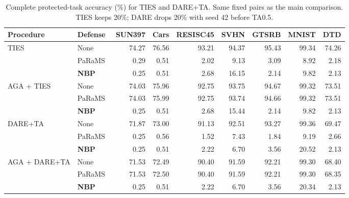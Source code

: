\begin{table}[!t]
\centering
\small
\setlength{\tabcolsep}{4pt}
\caption{Complete protected-task accuracy (\%) for TIES and DARE+TA. Same fixed pairs as the main comparison. TIES keeps 20\%; DARE drops 20\% with seed 42 before TA0.5.}
\label{tab:fusion-tasks}
\begin{tabular}{llrrrrrrr}
\toprule
Procedure & Defense & SUN397 & Cars & RESISC45 & SVHN & GTSRB & MNIST & DTD \\
\midrule
\multirow{3}{*}{TIES} & None & 74.27 & 76.56 & 93.21 & 94.37 & 95.43 & 99.34 & 74.26 \\
 & PaRaMS~\cite{wei2025params} & 0.29 & 0.51 & 2.02 & 9.13 & 3.09 & 8.92 & 2.18 \\
 & \textbf{NBP} & 0.25 & 0.51 & 2.68 & 16.15 & 2.14 & 9.82 & 2.13 \\
\midrule
\multirow{3}{*}{AGA + TIES} & None & 74.03 & 75.96 & 92.75 & 93.75 & 94.67 & 99.32 & 73.51 \\
 & PaRaMS~\cite{wei2025params} & 74.03 & 75.99 & 92.75 & 93.74 & 94.66 & 99.32 & 73.51 \\
 & \textbf{NBP} & 0.25 & 0.51 & 2.68 & 15.44 & 2.14 & 9.82 & 2.13 \\
\midrule
\multirow{3}{*}{DARE+TA} & None & 71.87 & 73.00 & 91.13 & 92.51 & 93.27 & 99.36 & 69.47 \\
 & PaRaMS~\cite{wei2025params} & 0.25 & 0.56 & 1.52 & 7.43 & 1.84 & 9.19 & 2.66 \\
 & \textbf{NBP} & 0.25 & 0.51 & 2.22 & 6.70 & 3.56 & 20.52 & 2.13 \\
\midrule
\multirow{3}{*}{AGA + DARE+TA} & None & 71.53 & 72.49 & 90.40 & 91.59 & 92.21 & 99.30 & 68.40 \\
 & PaRaMS~\cite{wei2025params} & 71.53 & 72.50 & 90.40 & 91.59 & 92.21 & 99.30 & 68.35 \\
 & \textbf{NBP} & 0.25 & 0.51 & 2.22 & 6.70 & 3.56 & 20.34 & 2.13 \\
\bottomrule
\end{tabular}
\end{table}

